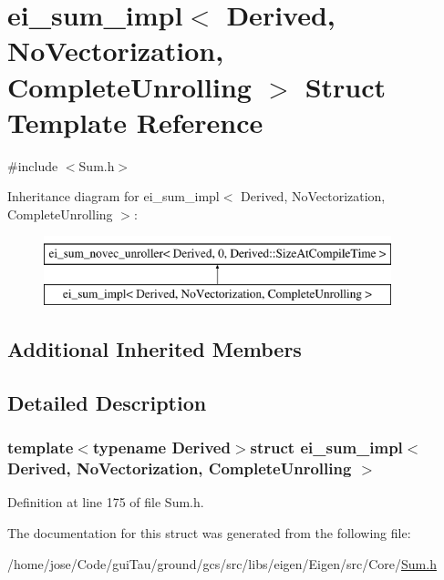 \hypertarget{structei__sum__impl_3_01_derived_00_01_no_vectorization_00_01_complete_unrolling_01_4}{\section{ei\-\_\-sum\-\_\-impl$<$ Derived, No\-Vectorization, Complete\-Unrolling $>$ Struct Template Reference}
\label{structei__sum__impl_3_01_derived_00_01_no_vectorization_00_01_complete_unrolling_01_4}
}


{\ttfamily \#include $<$Sum.\-h$>$}

Inheritance diagram for ei\-\_\-sum\-\_\-impl$<$ Derived, No\-Vectorization, Complete\-Unrolling $>$\-:\begin{figure}[H]
\begin{center}
\leavevmode
\includegraphics[height=2.000000cm]{structei__sum__impl_3_01_derived_00_01_no_vectorization_00_01_complete_unrolling_01_4}
\end{center}
\end{figure}
\subsection*{Additional Inherited Members}


\subsection{Detailed Description}
\subsubsection*{template$<$typename Derived$>$struct ei\-\_\-sum\-\_\-impl$<$ Derived, No\-Vectorization, Complete\-Unrolling $>$}



Definition at line 175 of file Sum.\-h.



The documentation for this struct was generated from the following file\-:\begin{DoxyCompactItemize}
\item 
/home/jose/\-Code/gui\-Tau/ground/gcs/src/libs/eigen/\-Eigen/src/\-Core/\hyperlink{_sum_8h}{Sum.\-h}\end{DoxyCompactItemize}
